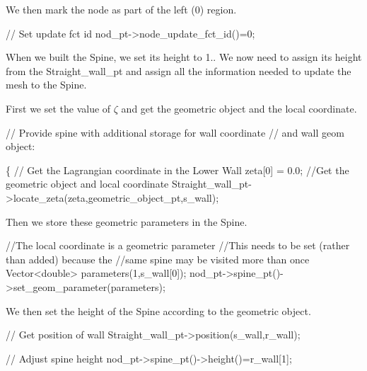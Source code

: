 We then mark the node as part of the left (0) region.


\begin{DoxyCodeInclude}
 \textcolor{comment}{// Set update fct id}
 nod\_pt->node\_update\_fct\_id()=0;

\end{DoxyCodeInclude}


When we built the Spine, we set its height to 1.. We now need to assign its height from the {\ttfamily Straight\+\_\+wall\+\_\+pt} and assign all the information needed to update the mesh to the Spine.

First we set the value of $\zeta$ and get the geometric object and the local coordinate.


\begin{DoxyCodeInclude}

 \textcolor{comment}{// Provide spine with additional storage for wall coordinate }
 \textcolor{comment}{// and wall geom object:}
 
 \{
  \textcolor{comment}{// Get the Lagrangian coordinate in the Lower Wall}
  zeta[0] =  0.0;
  \textcolor{comment}{//Get the geometric object and local coordinate}
  Straight\_wall\_pt->locate\_zeta(zeta,geometric\_object\_pt,s\_wall);

\end{DoxyCodeInclude}


Then we store these geometric parameters in the Spine.


\begin{DoxyCodeInclude}
  
  \textcolor{comment}{//The local coordinate is a geometric parameter}
  \textcolor{comment}{//This needs to be set (rather than added) because the}
  \textcolor{comment}{//same spine may be visited more than once}
  Vector<double> parameters(1,s\_wall[0]);
  nod\_pt->spine\_pt()->set\_geom\_parameter(parameters);

\end{DoxyCodeInclude}


We then set the height of the Spine according to the geometric object.


\begin{DoxyCodeInclude}
  
  \textcolor{comment}{// Get position of wall}
  Straight\_wall\_pt->position(s\_wall,r\_wall);
  
  \textcolor{comment}{// Adjust spine height}
  nod\_pt->spine\_pt()->height()=r\_wall[1];

\end{DoxyCodeInclude}


